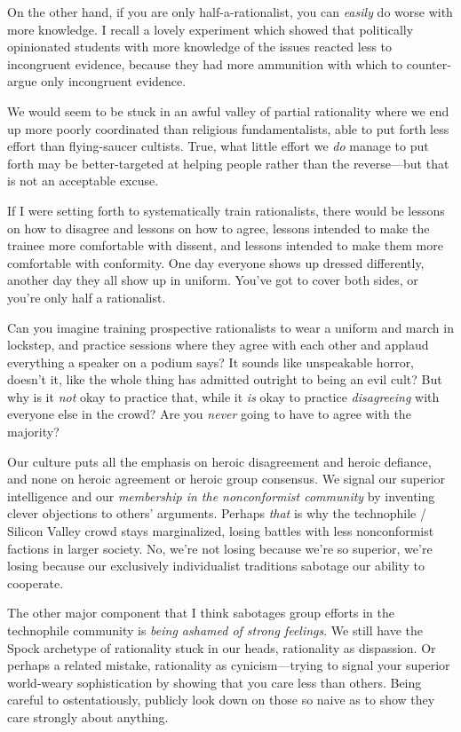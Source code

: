{
 On the other hand, if you are only half-a-rationalist, you can
\textit{easily} do worse with more knowledge. I recall a lovely
experiment which showed that politically opinionated students with more
knowledge of the issues reacted less to incongruent evidence, because
they had more ammunition with which to counter-argue only incongruent
evidence.}

{
 We would seem to be stuck in an awful valley of partial
rationality where we end up more poorly coordinated than religious
fundamentalists, able to put forth less effort than flying-saucer
cultists. True, what little effort we \textit{do} manage to put forth
may be better-targeted at helping people rather than the reverse---but
that is not an acceptable excuse.}

{
 If I were setting forth to systematically train rationalists,
there would be lessons on how to disagree and lessons on how to agree,
lessons intended to make the trainee more comfortable with dissent, and
lessons intended to make them more comfortable with conformity. One day
everyone shows up dressed differently, another day they all show up in
uniform. You've got to cover both sides, or
you're only half a rationalist.}

{
 Can you imagine training prospective rationalists to wear a
uniform and march in lockstep, and practice sessions where they agree
with each other and applaud everything a speaker on a podium says? It
sounds like unspeakable horror, doesn't it, like the
whole thing has admitted outright to being an evil cult? But why is it
\textit{not} okay to practice that, while it \textit{is} okay to
practice \textit{disagreeing} with everyone else in the crowd? Are you
\textit{never} going to have to agree with the majority?}

{
 Our culture puts all the emphasis on heroic disagreement and
heroic defiance, and none on heroic agreement or heroic group
consensus. We signal our superior intelligence and our
\textit{membership in the nonconformist community} by inventing clever
objections to others' arguments. Perhaps \textit{that}
is why the technophile / Silicon Valley crowd stays marginalized,
losing battles with less nonconformist factions in larger society. No,
we're not losing because we're so
superior, we're losing because our exclusively
individualist traditions sabotage our ability to cooperate.}

{
 The other major component that I think sabotages group efforts in
the technophile community is \textit{being ashamed of strong feelings}.
We still have the Spock archetype of rationality stuck in our heads,
rationality as dispassion. Or perhaps a related mistake, rationality as
cynicism---trying to signal your superior world-weary sophistication by
showing that you care less than others. Being careful to
ostentatiously, publicly look down on those so naive as to show they
care strongly about anything.}

